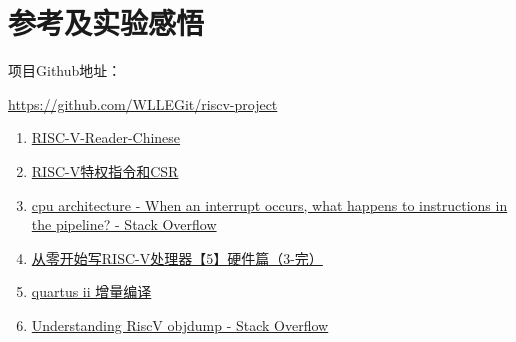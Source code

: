 \documentclass[]{article}
\begin{document}
  \section{参考及实验感悟}

  项目Github地址：
  
  \href{https://github.com/WLLEGit/riscv-project}{https://github.com/WLLEGit/riscv-project}
  \begin{enumerate}
      \item \href{http://crva.ict.ac.cn/documents/RISC-V-Reader-Chinese-v2p1.pdf}{RISC-V-Reader-Chinese}
      \item \href{https://www.jianshu.com/p/2152708d75f1}{RISC-V特权指令和CSR}
      \item \href{https://stackoverflow.com/questions/8902132/when-an-interrupt-occurs-what-happens-to-instructions-in-the-pipeline}{cpu architecture - When an interrupt occurs, what happens to instructions in the pipeline? - Stack Overflow}
      \item \href{https://zhuanlan.zhihu.com/p/183325078}{从零开始写RISC-V处理器【5】硬件篇（3-完）}
      \item \href{https://blog.csdn.net/qq_38376586/article/details/85309985}{quartus ii 增量编译}
      \item \href{https://stackoverflow.com/questions/51225939/understanding-riscv-objdump}{Understanding RiscV objdump - Stack Overflow}
  \end{enumerate}
  
\end{document}
